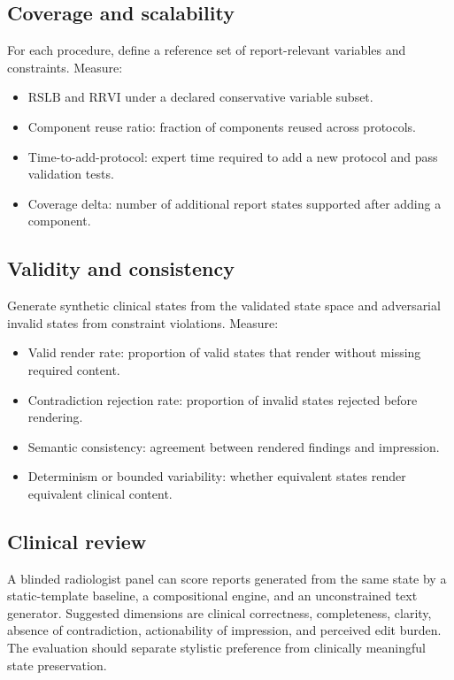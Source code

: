 \documentclass[11pt]{article}
\begin{document}
\subsection{Coverage and scalability}
For each procedure, define a reference set of report-relevant variables and constraints. Measure:
\begin{itemize}[leftmargin=*]
    \item $\mathrm{RSLB}$ and $\mathrm{RRVI}$ under a declared conservative variable subset.
    \item Component reuse ratio: fraction of components reused across protocols.
    \item Time-to-add-protocol: expert time required to add a new protocol and pass validation tests.
    \item Coverage delta: number of additional report states supported after adding a component.
\end{itemize}

\subsection{Validity and consistency}
Generate synthetic clinical states from the validated state space and adversarial invalid states from constraint violations. Measure:
\begin{itemize}[leftmargin=*]
    \item Valid render rate: proportion of valid states that render without missing required content.
    \item Contradiction rejection rate: proportion of invalid states rejected before rendering.
    \item Semantic consistency: agreement between rendered findings and impression.
    \item Determinism or bounded variability: whether equivalent states render equivalent clinical content.
\end{itemize}

\subsection{Clinical review}
A blinded radiologist panel can score reports generated from the same state by a static-template baseline, a compositional engine, and an unconstrained text generator. Suggested dimensions are clinical correctness, completeness, clarity, absence of contradiction, actionability of impression, and perceived edit burden. The evaluation should separate stylistic preference from clinically meaningful state preservation.
\end{document}

